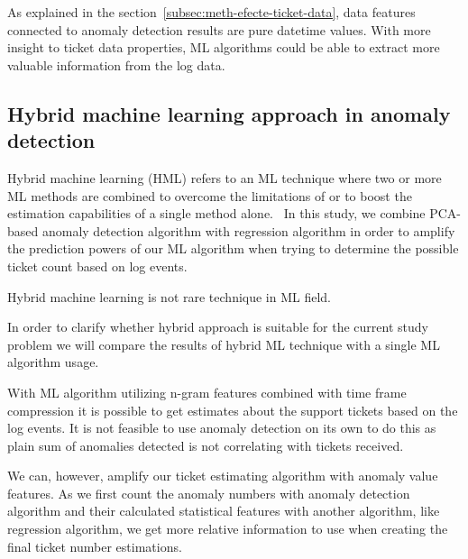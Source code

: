 As explained in the section~\ref{subsec:meth-efecte-ticket-data},
data features connected to anomaly detection results
are pure datetime values.
With more insight to ticket data properties,
ML algorithms could be able to extract more valuable information
from the log data.




\subsection{Hybrid machine learning approach in anomaly detection}\label{subsec:bg-hybrid-ml-approach-with-anomaly-detection}

Hybrid machine learning (HML)
refers to an ML technique
where two or more ML methods are combined
to overcome the limitations of
or to boost the estimation capabilities of
a single method alone.~\cite{Anifowose2020hml}
In this study,
we combine PCA-based anomaly detection algorithm
with regression algorithm
in order to amplify the prediction powers of our ML algorithm
when trying to determine the possible ticket count
based on log events.

Hybrid machine learning is not rare technique in ML field.~\cite{shon2007hybrid,tsai2010credit,mohan2019effective,
    hsieh2005hybrid,jain2007hybrid,kim2007hybrid,lee2002credit,malhotra2002differentiating}

In order to clarify whether hybrid approach is suitable for the current study problem
we will compare the results of hybrid ML technique
with a single ML algorithm usage.




With ML algorithm utilizing n-gram features combined with time frame compression
it is possible to get estimates
about the support tickets based on the log events.
It is not feasible to use anomaly detection on its own to do this
as plain sum of anomalies detected
is not correlating with tickets received.

We can, however,
amplify our ticket estimating algorithm with anomaly value features.
As we first count the anomaly numbers with anomaly detection algorithm %
and their calculated statistical features with another algorithm,
like regression algorithm,
we get more relative information to use
when creating the final ticket number estimations. %



